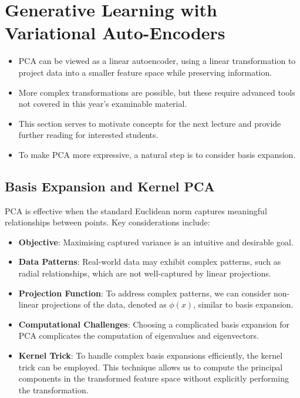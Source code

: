 \section{Generative Learning with Variational Auto-Encoders}

\begin{itemize}
    \item PCA can be viewed as a linear autoencoder, using a linear transformation to project data into a smaller feature space while preserving information.
    \item More complex transformations are possible, but these require advanced tools not covered in this year’s examinable material.
    \item This section serves to motivate concepts for the next lecture and provide further reading for interested students.
    \item To make PCA more expressive, a natural step is to consider basis expansion.
\end{itemize}



\subsection{Basis Expansion and Kernel PCA}

PCA is effective when the standard Euclidean norm captures meaningful relationships between points. Key considerations include:
\begin{itemize}
    \item \textbf{Objective}: Maximising captured variance is an intuitive and desirable goal.
    \item \textbf{Data Patterns}: Real-world data may exhibit complex patterns, such as radial relationships, which are not well-captured by linear projections.
    \item \textbf{Projection Function}: To address complex patterns, we can consider non-linear projections of the data, denoted as $\phi(x)$, similar to basis expansion.
    \item \textbf{Computational Challenges}: Choosing a complicated basis expansion for PCA complicates the computation of eigenvalues and eigenvectors.
    \item \textbf{Kernel Trick}: To handle complex basis expansions efficiently, the kernel trick can be employed. This technique allows us to compute the principal components in the transformed feature space without explicitly performing the transformation.
\end{itemize}

